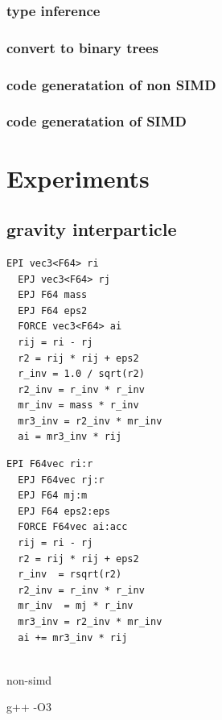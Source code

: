 \documentclass[ams, a4j]{U-AizuGT}
\begin{document}
\subsubsection{type inference}
\subsubsection{convert to binary trees}

\subsubsection{code generatation of non SIMD}


\subsubsection{code generatation of SIMD}




  
\section{Experiments}

\subsection{gravity interparticle}


\begin{lstlisting}[frame=single, caption=Nbody-kernel.pyker, label=Nbody-kernel.pyker]
  EPI vec3<F64> ri
  EPJ vec3<F64> rj
  EPJ F64 mass
  EPJ F64 eps2
  FORCE vec3<F64> ai
  rij = ri - rj
  r2 = rij * rij + eps2
  r_inv = 1.0 / sqrt(r2)
  r2_inv = r_inv * r_inv
  mr_inv = mass * r_inv
  mr3_inv = r2_inv * mr_inv
  ai = mr3_inv * rij
  \end{lstlisting}

\begin{lstlisting}[frame=single, caption=Nbody-kernel.pikg, label=Nbody-kernel.pikg]
  EPI F64vec ri:r
  EPJ F64vec rj:r
  EPJ F64 mj:m
  EPJ F64 eps2:eps
  FORCE F64vec ai:acc
  rij = ri - rj
  r2 = rij * rij + eps2
  r_inv  = rsqrt(r2)
  r2_inv = r_inv * r_inv
  mr_inv  = mj * r_inv
  mr3_inv = r2_inv * mr_inv
  ai += mr3_inv * rij
  
\end{lstlisting}




non-simd

g++ -O3 
\end{document}

